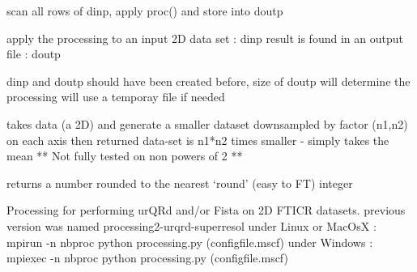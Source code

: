 \documentclass[letterpaper,10pt,openany,oneside]{sphinxmanual}
\begin{document}

\begin{fulllineitems}
\label{rst/code:processing.do_proc_F2}
scan all rows of dinp, apply proc() and store into doutp

\end{fulllineitems}


\begin{fulllineitems}
\label{rst/code:processing.do_process2D}
apply the processing to an input 2D data set : dinp
result is found in an output file : doutp

dinp and doutp should have been created before, size of doutp will determine the processing
will use a temporay file if needed

\end{fulllineitems}


\begin{fulllineitems}
\label{rst/code:processing.downsample2D}
takes data (a 2D) and generate a smaller dataset downsampled by factor (n1,n2) on each axis
then returned data-set is n1*n2 times smaller
- simply takes the mean
** Not fully tested on non powers of 2 **

\end{fulllineitems}


\begin{fulllineitems}
\label{rst/code:processing.intelliround}
returns a number rounded to the nearest `round' (easy to FT) integer

\end{fulllineitems}


\begin{fulllineitems}
\label{rst/code:processing.interfproc}
Processing for performing urQRd and/or Fista on 2D FTICR datasets.
previous version was named processing2-urqrd-superresol
under Linux or MacOsX : mpirun -n nbproc python processing.py (configfile.mscf)
under Windows : mpiexec -n nbproc python processing.py (configfile.mscf)

\end{fulllineitems}
\end{document}

